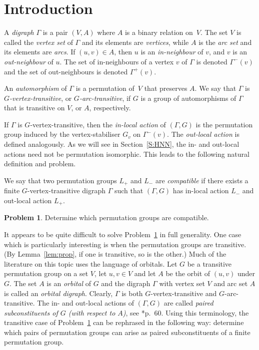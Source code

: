 \documentclass[twoside,12pt,leqno]{amsproc}
\numberwithin{table}{section}
\numberwithin{figure}{section}
\theoremstyle{plain}
\theoremstyle{definition}\newtheorem{definition}[theorem]{Definition}
\theoremstyle{definition}\newtheorem{example}[theorem]{Example}
\theoremstyle{definition}\newtheorem{construction}[theorem]{Construction}
\theoremstyle{definition}\newtheorem{remark}[theorem]{Remark}
\theoremstyle{definition}\newtheorem{problem}[theorem]{Problem}
\begin{document}
\maketitle

\section{Introduction}\label{sec:intro}

A \emph{digraph} $\Gamma$ is a pair $(V,A)$ where $A$ is a binary relation on~$V$. The set $V$ is called the \emph{vertex set} of $\Gamma$ and its elements are  \emph{vertices}, while $A$ is the \emph{arc set} and its elements are \emph{arcs}. If $(u,v)\in A$, then $u$ is an \emph{in-neighbour} of $v$, and $v$ is an \emph{out-neighbour} of $u$. The set of in-neighbours of a vertex $v$ of $\Gamma$ is denoted $\Gamma^-(v)$ and the set of out-neighbours is denoted $\Gamma^+(v)$. 

An \emph{automorphism} of $\Gamma$ is a permutation of~$V$ that preserves $A$. We say that $\Gamma$ is \emph{$G$-vertex-transitive}, or \emph{$G$-arc-transitive}, if $G$ is a group of automorphisms of $\Gamma$ that is transitive on $V$, or $A$, respectively.

If $\Gamma$ is $G$-vertex-transitive, then the \emph{in-local action}  of $(\Gamma,G)$ is the permutation group induced by the vertex-stabiliser $G_v$ on  $\Gamma^-(v)$. The \emph{out-local action} is defined analogously. As we will see in Section~\ref{S:HNN}, the in- and out-local actions need not be permutation isomorphic. This leads to the following natural definition and problem.

We say that two permutation groups  $L_+$ and $L_-$ are \emph{compatible} if there exists a finite $G$-vertex-transitive digraph $\Gamma$ such that $(\Gamma,G)$ has in-local action $L_-$ and out-local action $L_+$.

\begin{problem}\label{MainProblem}
Determine which permutation groups are compatible.
\end{problem}

It appears to be quite difficult to solve Problem~\ref{MainProblem} in full generality. One case which is particularly interesting is when the permutation groups are transitive. (By Lemma~\ref{lem:prop}, if one is transitive, so is the other.) Much of the literature on this topic uses the language of orbitals. Let $G$ be a transitive permutation group on a set $V$, let $u,v\in V$ and let $A$ be the orbit of $(u,v)$ under $G$. The set $A$ is an \emph{orbital} of $G$ and the digraph $\Gamma$ with vertex set $V$ and arc set $A$ is called an \emph{orbital digraph}. Clearly, $\Gamma$ is both $G$-vertex-transitive and $G$-arc-transitive. The in- and out-local actions of $(\Gamma,G)$ are called \emph{paired subconstituents of $G$ (with respect to $A$)}, see \cite{Cambook}*{p.~60}. Using this terminology, the transitive case of Problem~\ref{MainProblem} can be rephrased in the following way: determine which pairs of permutation groups can arise as  paired subconstituents of a finite permutation group.
\end{document}
